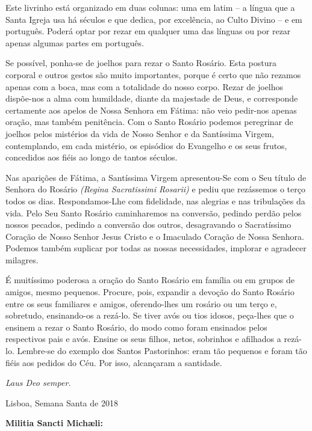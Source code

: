 Este livrinho está organizado em duas colunas: uma em latim – a língua que a Santa Igreja usa há séculos e que dedica, por excelência, ao Culto Divino – e em português. Poderá optar por rezar em qualquer uma das línguas ou por rezar apenas algumas partes em português.

Se possível, ponha-se de joelhos para rezar o Santo Rosário. Esta postura corporal e outros gestos são muito importantes, porque é certo que não rezamos apenas com a boca, mas com a totalidade do nosso corpo. Rezar de joelhos dispõe-nos a alma com humildade, diante da majestade de Deus, e corresponde certamente aos apelos de Nossa Senhora em Fátima: não veio pedir-nos apenas oração, mas também penitência. Com o Santo Rosário podemos peregrinar de joelhos pelos mistérios da vida de Nosso Senhor e da Santíssima Virgem, contemplando, em cada mistério, os episódios do Evangelho e os seus frutos, concedidos aos fiéis ao longo de tantos séculos.

Nas aparições de Fátima, a Santíssima Virgem apresentou-Se com o Seu título de Senhora do Rosário \textit{(Regina Sacratissimi Rosarii)} e pediu que rezássemos o terço todos os dias. Respondamos-Lhe com fidelidade, nas alegrias e nas tribulações da vida. Pelo Seu Santo Rosário caminharemos na conversão, pedindo perdão pelos nossos pecados, pedindo a conversão dos outros, desagravando o Sacratíssimo Coração de Nosso Senhor Jesus Cristo e o Imaculado Coração de Nossa Senhora. Podemos também suplicar por todas as nossas necessidades, implorar e agradecer milagres.

É muitíssimo poderosa a oração do Santo Rosário em família ou em grupos de amigos, mesmo pequenos. Procure, pois, expandir a devoção do Santo Rosário entre os seus familiares e amigos, oferendo-lhes um rosário ou um terço e, sobretudo, ensinando-os a rezá-lo. Se tiver avós ou tios idosos, peça-lhes que o ensinem a rezar o Santo Rosário, do modo como foram ensinados pelos respectivos pais e avós. Ensine os seus filhos, netos, sobrinhos e afilhados a rezá-lo. Lembre-se do exemplo dos Santos Pastorinhos: eram tão pequenos e foram tão fiéis aos pedidos do Céu. Por isso, alcançaram a santidade.

\textit{Laus Deo semper.}

Lisboa, Semana Santa de 2018


\textbf{Militia Sancti Michæli:}

